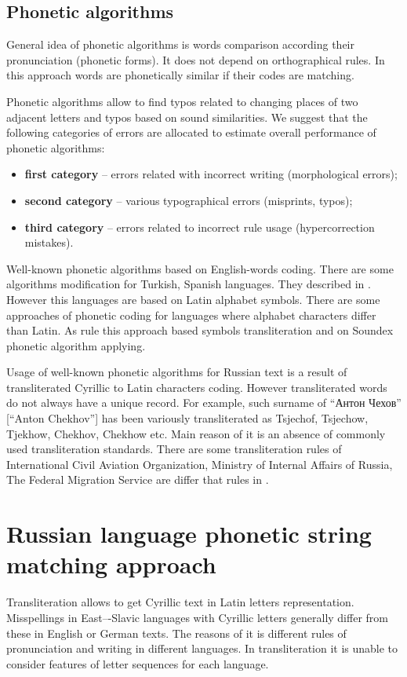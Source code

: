 \documentclass[conference,a4paper]{IEEEtran}
\begin{document}
\subsection{Phonetic algorithms}
General idea of phonetic algorithms is words comparison according their pronunciation (phonetic forms). It does not depend on orthographical rules. In this approach words are phonetically similar if their codes are matching.

Phonetic algorithms allow to find typos related to changing places of two adjacent letters and typos based on sound similarities. We suggest that the following categories of errors are allocated to estimate overall performance of phonetic algorithms:
\begin{itemize}
\item \textbf{first category} – errors related with incorrect writing (morphological errors);
\item \textbf{second category} – various typographical errors (misprints, typos);
\item \textbf{third category} – errors related to incorrect rule usage (hypercorrection \cite{Parubchenko-2005} mistakes).
\end{itemize}

Well-known phonetic algorithms based on English-words coding. There are some algorithms modification for Turkish, Spanish languages. They described in \cite{Alotaibi-2013}. However this languages are based on Latin alphabet symbols. There are some approaches of phonetic coding for languages where alphabet characters differ than Latin. As rule this approach based symbols transliteration and on Soundex phonetic algorithm \cite{Soundex} applying. 

Usage of well-known phonetic algorithms for Russian text is a result of transliterated Cyrillic to Latin characters coding. However transliterated words do not always have a unique record. For example, such surname of “Антон Чехов” [“Anton Chekhov”] has been variously transliterated as Tsjechof, Tsjechow, Tjekhow, Chekhov, Chekhow etc.  Main reason of it is an absence of commonly used transliteration standards. There are some transliteration rules of International Civil Aviation Organization, Ministry of Internal Affairs of Russia, The Federal Migration Service are differ that rules in \cite{GOST-2006}.

\section{Russian language phonetic string matching approach}
Transliteration allows to get Cyrillic text in Latin letters representation. Misspellings in East–-Slavic languages with Cyrillic letters generally differ from these in English or German texts. The reasons of it is different rules of pronunciation and writing in different languages. In transliteration it is unable to consider features of letter sequences for each language.
\end{document}
